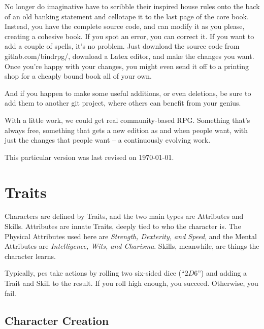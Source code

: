 \documentclass[titlepage,a4paper,openany]{book}
\begin{document}
{\begin{multicols}{2}
No longer do imaginative  have to scribble their inspired house rules onto the back of an old banking statement and cellotape it to the last page of the core book.  Instead, you have the complete source code, and can modify it as you please, creating a cohesive book.  If you spot an error, you can correct it.  If you want to add a couple of spells, it's no problem.  Just download the source code from gitlab.com/bindrpg/, download a Latex editor, and make the changes you want.  Once you're happy with your changes, you might even send it off to a printing shop for a cheaply bound book all of your own.

And if you happen to make some useful additions, or even deletions, be sure to add them to another git project, where others can benefit from your genius.

With a little work, we could get real community-based RPG.  Something that's always free, something that gets a new edition as and when people want, with just the changes that people want -- a continuously evolving work.

This particular version was last revised on \today.

\end{multicols}

}{}


\chapter{Traits}

\begin{multicols}{2}

Characters are defined by Traits, and the two main types are Attributes and Skills.
Attributes are innate Traits, deeply tied to who the character is.
The Physical Attributes used here are \textit{Strength, Dexterity, and Speed}, and the Mental Attributes are \textit{Intelligence, Wits, and Charisma}.
Skills, meanwhile, are things the character learns.

Typically, \glspl{pc} take actions by rolling two six-sided dice (``$2D6$'') and adding a Trait and Skill to the result.  If you roll high enough, you succeed.
Otherwise, you fail.

\end{multicols}

\section{Character Creation}\label{character_rolls} \iftoggle{verbose}{
\texttt{[image: images/Roch\_Hercka/five\_races.jpg]}
\label{roch:races}
}{}
\end{document}
